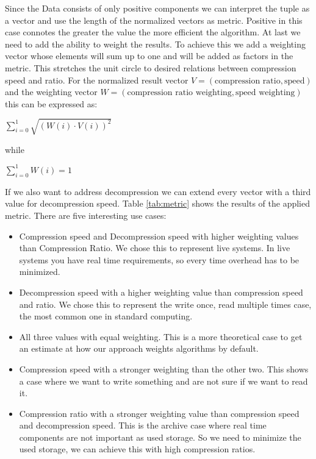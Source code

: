 \documentclass[
	12pt,
	a4paper,
	BCOR10mm,
	DIV14,
	listof=totoc,
	bibliography=totoc,
	headsepline
]{scrreprt}
\begin{document}
Since the Data consists of only positive components we can interpret the tuple as a vector and use the length of the normalized vectors as metric.
Positive in this case connotes the greater the value the more efficient the algorithm.
At last we need to add the ability to weight the results.
To achieve this we add a weighting vector whose elements will sum up to one and will be added as factors in the metric.
This stretches the unit circle to desired relations between compression speed and ratio.
For the normalized result vector \(V = (\text{compression ratio}, \text{speed})\) and the weighting vector \(W = (\text{compression ratio weighting}, \text{speed weighting})\) this can be expressed as:
\begin{center}
	\(
	\sum\limits^{1}_{i=0} \sqrt{(W(i) \cdot V(i))^2}
	\)
\end{center}
while
\begin{center}
	\(
	\sum\limits^{1}_{i=0}W(i) = 1
	\)
\end{center}
If we also want to address decompression we can extend every vector with a third value for decompression speed.
Table \ref{tab:metric} shows the results of the applied metric.
There are five interesting use cases:
\begin{itemize}
	\item Compression speed and Decompression speed with higher weighting values than Compression Ratio.
	We chose this to represent live systems.
	In live systems you have real time requirements, so every time overhead has to be minimized.
	\\
	\item Decompression speed with a higher weighting value than compression speed and ratio.
	We chose this to represent the write once, read multiple times case, the most common one in standard computing.
	\item All three values with equal weighting.
	This is a more theoretical case to get an estimate at how our approach weights algorithms by default.
	\\
	\item Compression speed with a stronger weighting than the other two.
	This shows a case where we want to write something and are not sure if we want to read it.
	\\
	\item Compression ratio with a stronger weighting value than compression speed and decompression speed.
	This is the archive case where real time components are not important as used storage.
	So we need to minimize the used storage, we can achieve this with high compression ratios.
\end{itemize}

\end{document}
